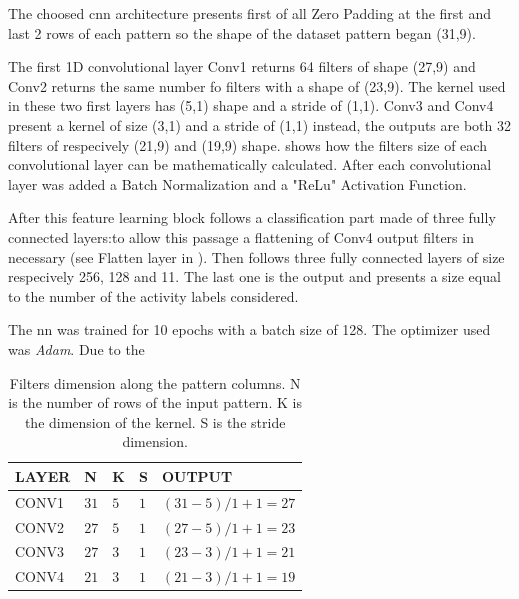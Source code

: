 The choosed \gls{cnn} architecture presents first of all Zero Padding at the first and last 2 rows of each pattern so the shape of the dataset pattern began (31,9).

The first 1D convolutional layer Conv1 returns 64 filters of shape (27,9) and Conv2 returns the same number fo filters with a shape of (23,9). The kernel used in these two first layers has (5,1) shape and a stride of (1,1).
Conv3 and Conv4 present a kernel of size (3,1) and a stride of (1,1) instead, the outputs are both 32 filters of respecively (21,9) and (19,9) shape.
 shows how the filters size of each convolutional layer can be mathematically calculated. After each convolutional layer was added a Batch Normalization and a "ReLu" Activation Function.

After this feature learning block follows a classification part made of three fully connected layers:to allow this passage a flattening of Conv4 output filters in necessary (see Flatten layer in ). Then follows three fully connected layers of size respecively 256, 128 and 11. The last one is the output and presents a size equal to the number of the activity labels considered.








The \gls{nn} was trained for 10 epochs with a batch size of 128. The optimizer used was \textit{Adam}. Due to the



\begin{table}[htp]
\small
	\centering
		\renewcommand{\arraystretch}{1}%
	\begin{tabular}{@{}lllll@{}}
	\toprule
	LAYER & N & K & S & OUTPUT\\
	\midrule
	CONV1 & $31$ & $5$ & $1$ & $(31-5)/1+1 = 27$\\
	CONV2 & $27$ & $5$ & $1$ & $(27-5)/1+1 = 23$\\
	CONV3 & $27$ & $3$ & $1$ & $(23-3)/1+1 = 21$\\
	CONV4 & $21$ & $3$ & $1$ & $(21-3)/1+1 = 19$\\
	\bottomrule
	\end{tabular}
	\caption{Filters dimension along the pattern columns. N is the number of rows of the input pattern. K is the dimension of the kernel. S is the stride dimension.}
	\label{tab:filtersize}
\end{table}
